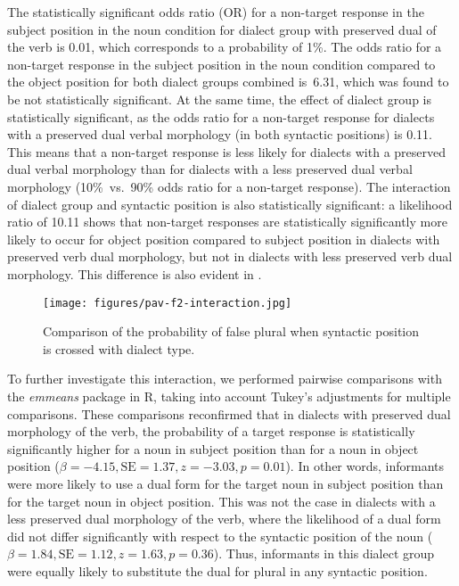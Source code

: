 \documentclass[output=paper,colorlinks,citecolor=brown]{langscibook}
\begin{document}
The statistically significant odds ratio (OR) for a non-target response in the subject position in the noun condition for dialect group with preserved dual of the verb is 0.01, which corresponds to a probability of 1\%. The odds ratio for a non-target response in the subject position in the noun condition compared to the object position for both dialect groups combined is~6.31, which was found to be not statistically significant. At the same time, the effect of dialect group is statistically significant, as the odds ratio for a non-target response for dialects with a preserved dual verbal morphology (in both syntactic positions) is 0.11. This means that a non-target response is less likely for dialects with a preserved dual verbal morphology than for dialects with a less preserved dual verbal morphology (10\%~vs.~90\% odds ratio for a non-target response). The interaction of dialect group and syntactic position is also statistically significant: a likelihood ratio of 10.11 shows that non-target responses are statistically significantly more likely to occur for object position compared to subject position in dialects with preserved verb dual morphology, but not in dialects with less preserved verb dual morphology. This difference is also evident in .

\begin{figure}
\texttt{[image: figures/pav-f2-interaction.jpg]}
\caption{Comparison of the probability of false plural when syntactic position is crossed with dialect type.}
\label{fig:pav:02}
\end{figure}

To further investigate this interaction, we performed pairwise comparisons with the \textit{emmeans} package in R, taking into account Tukey's adjustments for multiple comparisons. These comparisons reconfirmed that in dialects with preserved dual morphology of the verb, the probability of a target response is statistically significantly higher for a noun in subject position than for a noun in object position ($\beta=-4.15,\text{SE}=1.37,z=-3.03,p=0.01$). In other words, informants were more likely to use a dual form for the target noun in subject position than for the target noun in object position. This was not the case in dialects with a less preserved dual morphology of the verb, where the likelihood of a dual form did not differ significantly with respect to the syntactic position of the noun ($\beta=1.84,\text{SE}=1.12,z=1.63,p=0.36$). Thus, informants in this dialect group were equally likely to substitute the dual for plural in any syntactic position.
\end{document}
